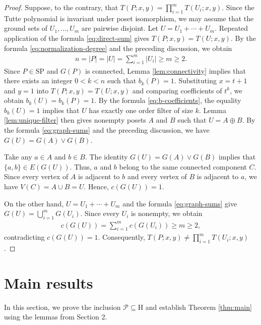 \documentclass[11pt,a4paper]{article}
\begin{document}
\begin{proof}
Suppose, to the contrary, that $T(P;x,y)=\prod_{i=1}^{m}T(U_i;x,y)$.
Since the Tutte polynomial is invariant under poset isomorphism,
we may assume that the ground sets of $U_1,\ldots,U_m$ are pairwise disjoint.
Let $U=U_1+\cdots+U_m$.
Repeated application of the formula \eqref{eq:direct-sum} gives $T(P;x,y)=T(U;x,y)$.
By the formula \eqref{eq:normalization-degree} and the preceding discussion, we obtain
\begin{eqnarray*}
n=|P|=|U|=\sum_{i=1}^{m}|U_i|\geq m\geq 2.
\end{eqnarray*}
Since $P\in\mathrm{SP}$ and $G(P)$ is connected,
Lemma \ref{lem:connectivity} implies that there exists an integer $0<k<n$ such that $b_k(P)=1$.
Substituting $x=t+1$ and $y=1$ into $T(P;x,y)=T(U;x,y)$ and comparing coefficients of $t^k$,
we obtain $b_k(U)=b_k(P)=1$.
By the formula \eqref{eq:b-coefficients}, the equality $b_k(U)=1$ implies that $U$ has exactly one order filter of size $k$.
Lemma \ref{lem:unique-filter} then gives nonempty posets $A$ and $B$ such that $U=A\oplus B$.
By the formula \eqref{eq:graph-sums} and the preceding discussion, we have $G(U)=G(A)\vee G(B)$.

Take any $a\in A$ and $b\in B$.
The identity $G(U)=G(A)\vee G(B)$ implies that $\{a,b\}\in E(G(U))$.
Thus, $a$ and $b$ belong to the same connected component $C$.
Since every vertex of $A$ is adjacent to $b$ and every vertex of $B$ is adjacent to $a$,
we have $V(C)=A\cup B=U$. Hence, $c(G(U))=1$.

On the other hand, $U=U_1+\cdots+U_m$ and the formula \eqref{eq:graph-sums} give $G(U)=\bigcup_{i=1}^{m}G(U_i)$.
Since every $U_i$ is nonempty, we obtain
\begin{eqnarray*}
c(G(U))=\sum_{i=1}^{m}c(G(U_i))\geq m\geq 2,
\end{eqnarray*}
contradicting $c(G(U))=1$. Consequently, $T(P;x,y)\neq\prod_{i=1}^{m}T(U_i;x,y)$.
\end{proof}

\section{Main results}

In this section, we prove the inclusion $\mathcal P\subseteq\mathrm H$ and establish
Theorem \ref{thm:main} using the lemmas from Section 2.
\end{document}
